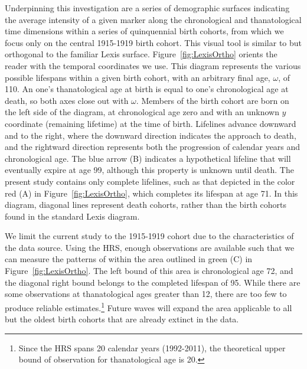 \documentclass[11pt,oneside,a4paper]{article}
\begin{document}
Underpinning this investigation are a series of demographic surfaces indicating
the average intensity of a given marker along the chronological and thanatological
time dimensions within a series of quinquennial birth cohorts, from which we
focus only on the central 1915-1919 birth cohort.
This visual tool is similar to but orthogonal to the familiar Lexis surface.
Figure~\ref{fig:LexisOrtho} orients the reader with the temporal coordinates we
use. This diagram represents the various possible lifespans within a given birth cohort, with an arbitrary final age, $\omega$, of 110. An one's
thanatological age at birth is equal to one's chronological age at death, so
both axes close out with $\omega$. Members of the birth cohort are born on the
left side of the diagram, at chronological age zero and with an unknown $y$ coordinate (remaining lifetime) at the time of birth.
Lifelines advance downward and to the right, where the downward direction indicates the approach to death, and the
rightward direction represents both the progression of calendar years and
chronological age. The blue arrow (B) indicates a hypothetical lifeline that
will eventually expire at age 99, although this property is unknown until death. The
present study contains only complete lifelines, such as that depicted in the
color red (A) in Figure~\ref{fig:LexisOrtho}, which completes its lifespan at
age 71. In this diagram, diagonal lines represent death cohorts, rather than the
birth cohorts found in the standard Lexis diagram.

We limit the current study to the 1915-1919 cohort due
to the characteristics of the data source. Using the HRS, enough
observations are available such that we can measure the patterns of
within the area outlined in green (C) in Figure~\ref{fig:LexisOrtho}. The
left bound of this area is chronological age 72, and the diagonal right
bound belongs to the completed lifespan of 95. While there are some observations
at thanatological ages greater than 12, there are too few to produce reliable
estimates.\footnote{Since the HRS spans 20 calendar years (1992-2011), the
theoretical upper bound of observation for thanatological age is 20.} Future
waves will expand the area applicable to all but the oldest birth cohorts that are already extinct in the data.
\end{document}
